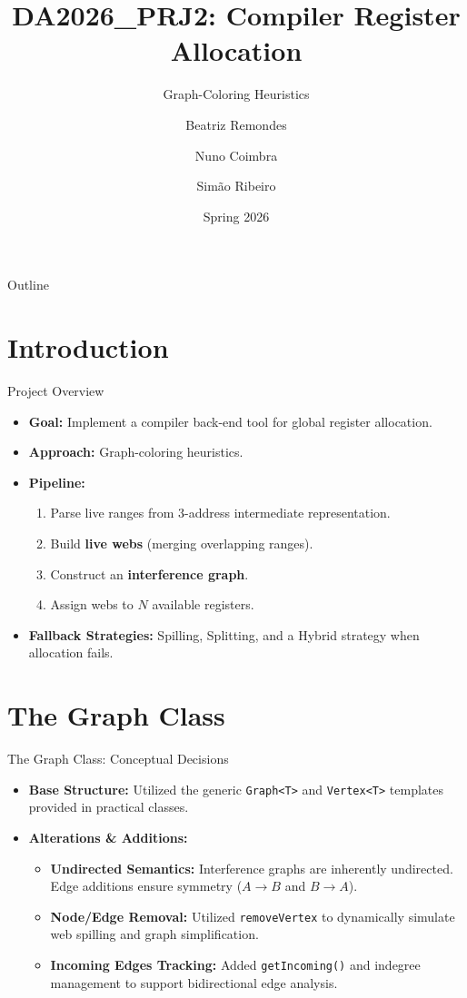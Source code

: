\documentclass{beamer}
\title[Register Allocation]{DA2026\_PRJ2: Compiler Register Allocation}
\subtitle{Graph-Coloring Heuristics}
\author[Group 4 - Class 5]{Beatriz Remondes \and Nuno Coimbra \and Simão Ribeiro}
\institute[FEUP]{Faculty of Engineering, University of Porto}
\date{Spring 2026}
\begin{document}
\begin{frame}
    \titlepage
\end{frame}

\begin{frame}{Outline}
    \tableofcontents
\end{frame}

\section{Introduction}
\begin{frame}{Project Overview}
    \begin{itemize}
        \item \textbf{Goal:} Implement a compiler back-end tool for global register allocation.
        \item \textbf{Approach:} Graph-coloring heuristics.
        \item \textbf{Pipeline:}
        \begin{enumerate}
            \item Parse live ranges from 3-address intermediate representation.
            \item Build \textbf{live webs} (merging overlapping ranges).
            \item Construct an \textbf{interference graph}.
            \item Assign webs to $N$ available registers.
        \end{enumerate}
        \item \textbf{Fallback Strategies:} Spilling, Splitting, and a Hybrid strategy when allocation fails.
    \end{itemize}
\end{frame}

\section{The Graph Class}
\begin{frame}{The Graph Class: Conceptual Decisions}
    \begin{itemize}
        \item \textbf{Base Structure:} Utilized the generic \texttt{Graph<T>} and \texttt{Vertex<T>} templates provided in practical classes.
        \item \textbf{Alterations \& Additions:}
        \begin{itemize}
            \item \textbf{Undirected Semantics:} Interference graphs are inherently undirected. Edge additions ensure symmetry ($A \rightarrow B$ and $B \rightarrow A$).
            \item \textbf{Node/Edge Removal:} Utilized \texttt{removeVertex} to dynamically simulate web spilling and graph simplification.
            \item \textbf{Incoming Edges Tracking:} Added \texttt{getIncoming()} and indegree management to support bidirectional edge analysis.
        \end{itemize}
    \end{itemize}
\end{frame}
\end{document}
